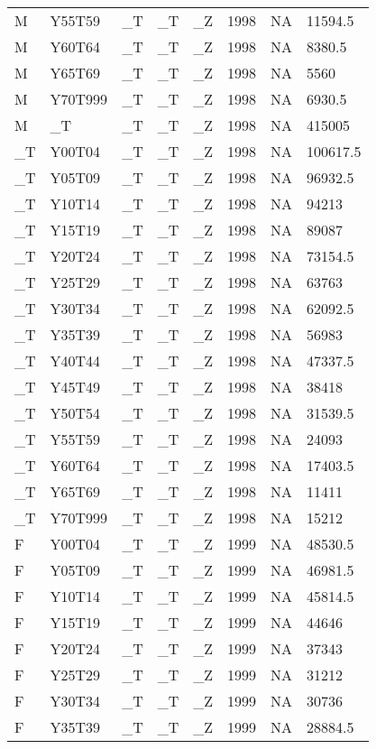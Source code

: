 \begin{longtable}[t]{llllllll}
M & Y55T59 & \_T & \_T & \_Z & 1998 & NA & 11594.5\\
M & Y60T64 & \_T & \_T & \_Z & 1998 & NA & 8380.5\\
\addlinespace
M & Y65T69 & \_T & \_T & \_Z & 1998 & NA & 5560\\
M & Y70T999 & \_T & \_T & \_Z & 1998 & NA & 6930.5\\
M & \_T & \_T & \_T & \_Z & 1998 & NA & 415005\\
\_T & Y00T04 & \_T & \_T & \_Z & 1998 & NA & 100617.5\\
\_T & Y05T09 & \_T & \_T & \_Z & 1998 & NA & 96932.5\\
\addlinespace
\_T & Y10T14 & \_T & \_T & \_Z & 1998 & NA & 94213\\
\_T & Y15T19 & \_T & \_T & \_Z & 1998 & NA & 89087\\
\_T & Y20T24 & \_T & \_T & \_Z & 1998 & NA & 73154.5\\
\_T & Y25T29 & \_T & \_T & \_Z & 1998 & NA & 63763\\
\_T & Y30T34 & \_T & \_T & \_Z & 1998 & NA & 62092.5\\
\addlinespace
\_T & Y35T39 & \_T & \_T & \_Z & 1998 & NA & 56983\\
\_T & Y40T44 & \_T & \_T & \_Z & 1998 & NA & 47337.5\\
\_T & Y45T49 & \_T & \_T & \_Z & 1998 & NA & 38418\\
\_T & Y50T54 & \_T & \_T & \_Z & 1998 & NA & 31539.5\\
\_T & Y55T59 & \_T & \_T & \_Z & 1998 & NA & 24093\\
\addlinespace
\_T & Y60T64 & \_T & \_T & \_Z & 1998 & NA & 17403.5\\
\_T & Y65T69 & \_T & \_T & \_Z & 1998 & NA & 11411\\
\_T & Y70T999 & \_T & \_T & \_Z & 1998 & NA & 15212\\
F & Y00T04 & \_T & \_T & \_Z & 1999 & NA & 48530.5\\
F & Y05T09 & \_T & \_T & \_Z & 1999 & NA & 46981.5\\
\addlinespace
F & Y10T14 & \_T & \_T & \_Z & 1999 & NA & 45814.5\\
F & Y15T19 & \_T & \_T & \_Z & 1999 & NA & 44646\\
F & Y20T24 & \_T & \_T & \_Z & 1999 & NA & 37343\\
F & Y25T29 & \_T & \_T & \_Z & 1999 & NA & 31212\\
F & Y30T34 & \_T & \_T & \_Z & 1999 & NA & 30736\\
\addlinespace
F & Y35T39 & \_T & \_T & \_Z & 1999 & NA & 28884.5\\

\end{longtable}
